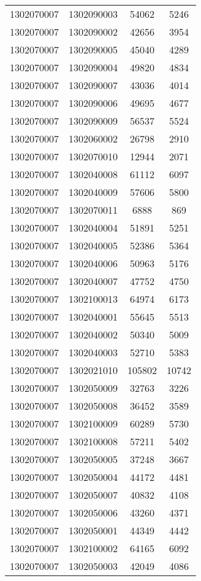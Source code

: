 \begin{longtable}[h]{llcc}
		1302070007 & 1302090003 & 54062 & 5246\\
		1302070007 & 1302090002 & 42656 & 3954\\
		1302070007 & 1302090005 & 45040 & 4289\\
		1302070007 & 1302090004 & 49820 & 4834\\
		1302070007 & 1302090007 & 43036 & 4014\\
		1302070007 & 1302090006 & 49695 & 4677\\
		1302070007 & 1302090009 & 56537 & 5524\\
		1302070007 & 1302060002 & 26798 & 2910\\
		1302070007 & 1302070010 & 12944 & 2071\\
		1302070007 & 1302040008 & 61112 & 6097\\
		1302070007 & 1302040009 & 57606 & 5800\\
		1302070007 & 1302070011 & 6888 & 869\\
		1302070007 & 1302040004 & 51891 & 5251\\
		1302070007 & 1302040005 & 52386 & 5364\\
		1302070007 & 1302040006 & 50963 & 5176\\
		1302070007 & 1302040007 & 47752 & 4750\\
		1302070007 & 1302100013 & 64974 & 6173\\
		1302070007 & 1302040001 & 55645 & 5513\\
		1302070007 & 1302040002 & 50340 & 5009\\
		1302070007 & 1302040003 & 52710 & 5383\\
		1302070007 & 1302021010 & 105802 & 10742\\
		1302070007 & 1302050009 & 32763 & 3226\\
		1302070007 & 1302050008 & 36452 & 3589\\
		1302070007 & 1302100009 & 60289 & 5730\\
		1302070007 & 1302100008 & 57211 & 5402\\
		1302070007 & 1302050005 & 37248 & 3667\\
		1302070007 & 1302050004 & 44172 & 4481\\
		1302070007 & 1302050007 & 40832 & 4108\\
		1302070007 & 1302050006 & 43260 & 4371\\
		1302070007 & 1302050001 & 44349 & 4442\\
		1302070007 & 1302100002 & 64165 & 6092\\
		1302070007 & 1302050003 & 42049 & 4086\\

\end{longtable}
